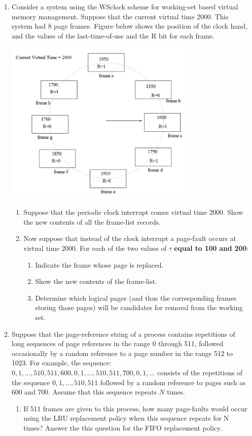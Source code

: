 \documentclass[11pt]{article}
\begin{document}
\begin{enumerate}
  \newpage
  \item Consider a system using the WSclock scheme for working-set based virtual memory management.  Suppose that the current virtual time 2000.  This system had 8 page frames.  Figure below shows the position of the clock hand, and the values of the last-time-of-use and the R bit for each frame.
    \begin{center}
      \includegraphics[width=0.75\textwidth]{5.png}
    \end{center}
    \begin{enumerate}
      \item Suppose that the periodic clock interrupt comes virtual time 2000.  Show the new contents of all the frame-list records.
      \item Now suppose that instead of the clock interrupt a page-fault occurs at virtual time 2000.  For each of the two values of \(\tau\) \textbf{equal to 100 and 200}:
        \begin{enumerate}
          \item Indicate the frame whose page is replaced.
          \item Show the new contents of the frame-list.
          \item Determine which logical pages (and thus the corresponding frames storing those pages) will be candidates for removal from the working set.
        \end{enumerate}
    \end{enumerate}
    
  \newpage
  \item Suppose that the page-reference string of a process contains repetitions of long sequences of page references in the range 0 through 511, followed occasionally by a random reference to a page number in the range 512 to 1023.  For example, the sequence: \(0, 1, \hdots, 510, 511, 600, 0, 1, \hdots, 510, 511, 700, 0, 1, \hdots\) consists of the repetitions of the sequence \(0, 1, \hdots, 510, 511\) followed by a random reference to pages such as 600 and 700. Assume that this sequence repeats \(N\) times.
    \begin{enumerate}
      \item If 511 frames are given to this process, how many page-faults would occur using the LRU replacement policy when this sequence repeats for N times?  Answer the this question for the FIFO replacement policy.


\end{enumerate}
\end{enumerate}
\end{document}
